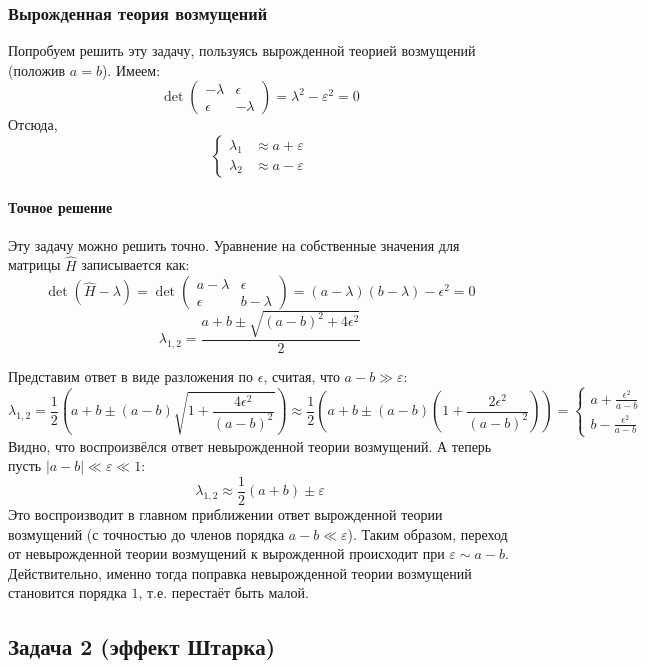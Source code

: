 \documentclass[a4paper,12pt]{article}
\begin{document}
\subsubsection*{Вырожденная теория возмущений}
Попробуем решить эту задачу, пользуясь вырожденной теорией возмущений (положив $a=b$). Имеем:
$$
\det\begin{pmatrix}-\lambda & \epsilon\\
\epsilon & -\lambda
\end{pmatrix}=\lambda^2-\varepsilon^2=0
$$
Отсюда,
\[
\begin{cases}
\lambda_{1} & \approx a+\varepsilon\\
\lambda_{2} & \approx a-\varepsilon
\end{cases}
\]
\paragraph{Точное решение}

Эту задачу можно решить точно. Уравнение на собственные значения для
матрицы $\hat{H}$ записывается как:
\[
\det\left(\hat{H}-\lambda\right)=\det\begin{pmatrix}a-\lambda & \epsilon\\
\epsilon & b-\lambda
\end{pmatrix}=(a-\lambda)(b-\lambda)-\epsilon^{2}=0
\]
\[
\lambda_{1,2}=\frac{a+b\pm\sqrt{(a-b)^{2}+4\epsilon^{2}}}{2}
\]


\noindent
Представим ответ в виде разложения по $\epsilon$, считая, что $a-b\gg\varepsilon$:
\[
\lambda_{1,2}=\frac{1}{2}\left(a+b\pm(a-b)\sqrt{1+\frac{4\epsilon^{2}}{(a-b)^{2}}}\right)
\approx\frac{1}{2}\left(a+b\pm(a-b)\left(1+\frac{2\epsilon^{2}}{\left(a-b\right)^{2}}\right)\right)=\begin{cases}
a+\frac{\epsilon^{2}}{a-b}\\
b-\frac{\epsilon^{2}}{a-b}
\end{cases}
\]
Видно, что воспроизвёлся ответ невырожденной теории возмущений.
\noindent
А теперь пусть $|a-b|\ll\varepsilon\ll1$:
\[
\lambda_{1,2}\approx\frac{1}{2}(a+b)\pm\varepsilon
\]
Это воспроизводит в главном приближении ответ вырожденной теории возмущений (с точностью до членов порядка $a-b\ll\varepsilon$). Таким образом, переход от невырожденной теории возмущений к вырожденной происходит при $\varepsilon\sim a-b$. Действительно, именно тогда поправка невырожденной теории возмущений становится порядка $1$, т.е. перестаёт быть малой.


\subsection*{Задача 2 (эффект Штарка)}
\end{document}
